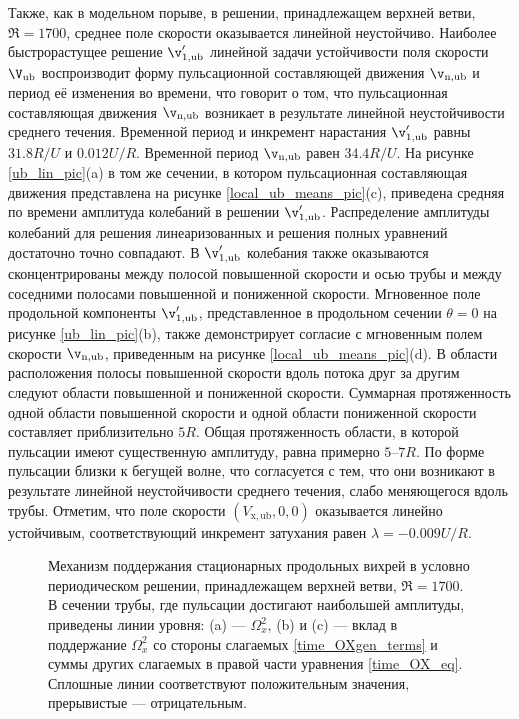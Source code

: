 Также, как в модельном порыве, в решении, принадлежащем верхней ветви, $\Re = 1700$, среднее поле скорости оказывается линейной неустойчиво. Наиболее быстрорастущее решение $\v'_\mathrm{1,ub}$ линейной задачи устойчивости поля скорости $\V_\mathrm{ub}$ воспроизводит форму пульсационной составляющей движения $\v_\mathrm{n,ub}$ и период её изменения во времени, что говорит о том, что пульсационная составляющая движения $\v_\mathrm{n,ub}$ возникает в результате линейной неустойчивости среднего течения. Временной период и инкремент нарастания $\v'_\mathrm{1,ub}$ равны $31.8R/U$ и $0.012U/R$. Временной период $\v_\mathrm{n,ub}$ равен $34.4R/U$. На рисунке \ref{ub_lin_pic}(a) в том же сечении, в котором пульсационная составляющая движения представлена на рисунке \ref{local_ub_means_pic}(c), приведена средняя по времени амплитуда колебаний в решении $\v'_\mathrm{1,ub}$. Распределение амплитуды колебаний для решения линеаризованных и решения полных уравнений достаточно точно совпадают. В $\v'_\mathrm{1,ub}$ колебания также оказываются сконцентрированы между полосой повышенной скорости и осью трубы и между соседними полосами повышенной и пониженной скорости. Мгновенное поле продольной компоненты $\v'_\mathrm{1,ub}$, представленное в продольном сечении $\theta = 0$ на рисунке \ref{ub_lin_pic}(b), также демонстрирует согласие с мгновенным полем скорости $\v_\mathrm{n,ub}$, приведенным на рисунке \ref{local_ub_means_pic}(d). В области расположения полосы повышенной скорости вдоль потока друг за другим следуют области повышенной и пониженной скорости. Суммарная протяженность одной области повышенной скорости и одной области пониженной скорости составляет приблизительно $5R$. Общая протяженность области, в которой пульсации имеют существенную амплитуду, равна примерно $5$--$7R$. По форме пульсации близки к бегущей волне, что согласуется с тем, что они возникают в результате линейной неустойчивости среднего течения, слабо меняющегося вдоль трубы. Отметим, что поле скорости $(V_\mathrm{x,ub}, 0, 0)$ оказывается линейно устойчивым, соответствующий инкремент затухания равен $\lambda = -0.009U/R$. 


\begin{figure}
\caption{Механизм поддержания стационарных продольных вихрей в условно периодическом решении, принадлежащем верхней ветви, $\Re = 1700$. В сечении трубы, где пульсации достигают наибольшей амплитуды, приведены линии уровня: (a) --- $\Omega_x^2$, (b) и (c) --- вклад в поддержание $\Omega_x^2$ со стороны слагаемых \eqref{time_OXgen_terms} и суммы других слагаемых в правой части уравнения \eqref{time_OX_eq}. Сплошные линии соответствуют положительным значения, прерывистые --- отрицательным.}
\label{ub_OXgen_pic}
\end{figure}


